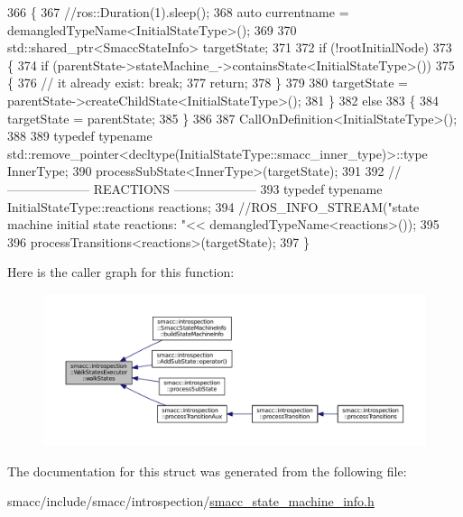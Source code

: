 \begin{DoxyCode}
366 \{
367     \textcolor{comment}{//ros::Duration(1).sleep();}
368     \textcolor{keyword}{auto} currentname = demangledTypeName<InitialStateType>();
369 
370     std::shared\_ptr<SmaccStateInfo> targetState;
371 
372     \textcolor{keywordflow}{if} (!rootInitialNode)
373     \{
374         \textcolor{keywordflow}{if} (parentState->stateMachine\_->containsState<InitialStateType>())
375         \{
376             \textcolor{comment}{// it already exist: break;}
377             \textcolor{keywordflow}{return};
378         \}
379 
380         targetState = parentState->createChildState<InitialStateType>();
381     \}
382     \textcolor{keywordflow}{else}
383     \{
384         targetState = parentState;
385     \}
386 
387     CallOnDefinition<InitialStateType>();
388 
389     \textcolor{keyword}{typedef} \textcolor{keyword}{typename} std::remove\_pointer<decltype(InitialStateType::smacc\_inner\_type)>::type InnerType;
390     processSubState<InnerType>(targetState);
391 
392     \textcolor{comment}{// -------------------- REACTIONS --------------------}
393     \textcolor{keyword}{typedef} \textcolor{keyword}{typename} InitialStateType::reactions reactions;
394     \textcolor{comment}{//ROS\_INFO\_STREAM("state machine initial state reactions: "<< demangledTypeName<reactions>());}
395 
396     processTransitions<reactions>(targetState);
397 \}
\end{DoxyCode}


Here is the caller graph for this function\+:
\nopagebreak
\begin{figure}[H]
\begin{center}
\leavevmode
\includegraphics[width=350pt]{structsmacc_1_1introspection_1_1WalkStatesExecutor_a21848ccc6e7a7ddee0ccfff97e550ec6_icgraph}
\end{center}
\end{figure}




The documentation for this struct was generated from the following file\+:\begin{DoxyCompactItemize}
\item 
smacc/include/smacc/introspection/\hyperlink{smacc__state__machine__info_8h}{smacc\+\_\+state\+\_\+machine\+\_\+info.\+h}\end{DoxyCompactItemize}
